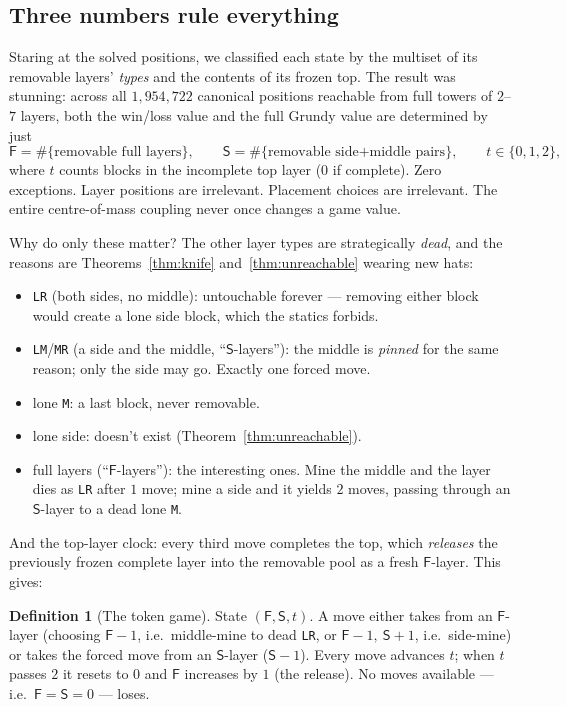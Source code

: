 \documentclass[11pt]{article}
\theoremstyle{definition}
\newtheorem{definition}[theorem]{Definition}
\theoremstyle{remark}
\newcommand{\Fq}{\mathsf{F}}
\newcommand{\Sq}{\mathsf{S}}
\newcommand{\layer}[1]{\texttt{#1}}
\begin{document}
\subsection{Three numbers rule everything}

Staring at the solved positions, we classified each state by the multiset
of its removable layers' \emph{types} and the contents of its frozen top.
The result was stunning: across all $1{,}954{,}722$ canonical positions
reachable from full towers of $2$--$7$ layers, both the win/loss value and
the full Grundy value are determined by just
\[
\Fq = \#\{\text{removable full layers}\}, \qquad
\Sq = \#\{\text{removable side+middle pairs}\}, \qquad
t \in \{0,1,2\},
\]
where $t$ counts blocks in the incomplete top layer ($0$ if complete).
Zero exceptions. Layer positions are irrelevant. Placement choices are
irrelevant. The entire centre-of-mass coupling never once changes a game
value.

Why do only these matter? The other layer types are strategically
\emph{dead}, and the reasons are Theorems~\ref{thm:knife}
and~\ref{thm:unreachable} wearing new hats:

\begin{itemize}
\item \layer{LR} (both sides, no middle): untouchable forever --- removing
either block would create a lone side block, which the statics forbids.
\item \layer{LM}/\layer{MR} (a side and the middle, ``$\Sq$-layers''): the
middle is \emph{pinned} for the same reason; only the side may go. Exactly
one forced move.
\item lone \layer{M}: a last block, never removable.
\item lone side: doesn't exist (Theorem~\ref{thm:unreachable}).
\item full layers (``$\Fq$-layers''): the interesting ones. Mine the middle
and the layer dies as \layer{LR} after $1$ move; mine a side and it yields
$2$ moves, passing through an $\Sq$-layer to a dead lone \layer{M}.
\end{itemize}

And the top-layer clock: every third move completes the top, which
\emph{releases} the previously frozen complete layer into the removable
pool as a fresh $\Fq$-layer. This gives:

\begin{definition}[The token game]
State $(\Fq, \Sq, t)$. A move either takes from an $\Fq$-layer (choosing
$\Fq{-}1$, i.e.\ middle-mine to dead \layer{LR}, or $\Fq{-}1,\ \Sq{+}1$,
i.e.\ side-mine) or takes the forced move from an $\Sq$-layer
($\Sq{-}1$). Every move advances $t$; when $t$ passes $2$ it resets to $0$
and $\Fq$ increases by $1$ (the release). No moves available --- i.e.\
$\Fq = \Sq = 0$ --- loses.
\end{definition}
\end{document}
